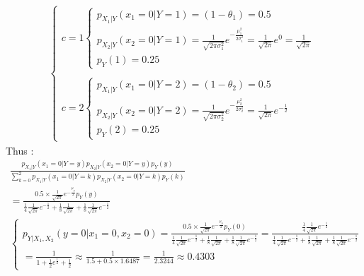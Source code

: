 \documentclass[12pt]{article}
\begin{document}
\begin{qsolve}
\begin{gather*}
\begin{cases}
            c = 1 \begin{cases}
                p_{X_1|Y}(x_1 = 0|Y=1) = (1 - \theta_1) = 0.5                                                                                                        \\
                p_{X_2|Y}(x_2 = 0|Y=1) = \frac{1}{\sqrt{2 \pi \sigma_1^2}} e^{-\frac{\mu_1^2}{2 \sigma_1^2}} = \frac{1}{\sqrt{2 \pi}} e^{0} = \frac{1}{\sqrt{2 \pi}} \\
                p_Y(1) = 0.25
            \end{cases} \\ \\
            c = 2 \begin{cases}
                p_{X_1|Y}(x_1 = 0|Y=2) = (1 - \theta_2) = 0.5                                                                                          \\
                p_{X_2|Y}(x_2 = 0|Y=2) = \frac{1}{\sqrt{2 \pi \sigma_2^2}} e^{-\frac{\mu_2^2}{2 \sigma_2^2}} = \frac{1}{\sqrt{2 \pi}} e^{-\frac{1}{2}} \\
                p_Y(2) = 0.25
            \end{cases}
        \end{cases}
    \end{gather*}
    Thus :
    \begin{gather*}
        \frac{p_{X_1|Y}(x_1 = 0|Y=y) p_{X_2|Y}(x_2 = 0|Y=y) p_Y(y)}{\sum_{k=0}^{2} p_{X_1|Y}(x_1 = 0|Y=k) p_{X_2|Y}(x_2 = 0|Y=k) p_Y(k)}\\
        = \frac{0.5 \times \frac{1}{\sqrt{2 \pi}} e^{-\frac{\mu_y}{2}} p_Y(y) }{\frac{1}{4} \frac{1}{\sqrt{2 \pi}} e^{-\frac{1}{2}} + \frac{1}{8}  \frac{1}{\sqrt{2 \pi}} + \frac{1}{8}  \frac{1}{\sqrt{2 \pi}} e^{-\frac{1}{2}}}\\
        \begin{cases}
            p_{Y|X_1,X_2}(y = 0|x_1 = 0 ,x_2 = 0) = \frac{0.5 \times \frac{1}{\sqrt{2 \pi}} e^{-\frac{\mu_0}{2}} p_Y(0) }{\frac{1}{4} \frac{1}{\sqrt{2 \pi}} e^{-\frac{1}{2}} + \frac{1}{8}  \frac{1}{\sqrt{2 \pi}} + \frac{1}{8}  \frac{1}{\sqrt{2 \pi}} e^{-\frac{1}{2}}} = \frac{\frac{1}{4} \frac{1}{\sqrt{2 \pi}} e^{-\frac{1}{2}}}{\frac{1}{4} \frac{1}{\sqrt{2 \pi}} e^{-\frac{1}{2}} + \frac{1}{8}  \frac{1}{\sqrt{2 \pi}} + \frac{1}{8}  \frac{1}{\sqrt{2 \pi}} e^{-\frac{1}{2}}} \\
            = \frac{1}{1 + \frac{1}{2} e^{\frac{1}{2}} + \frac{1}{2} } \approx \frac{1}{1.5 + 0.5 \times 1.6487} = \frac{1}{2.3244} \approx 0.4303
        \end{cases}\\

\end{gather*}
\end{qsolve}
\end{document}
